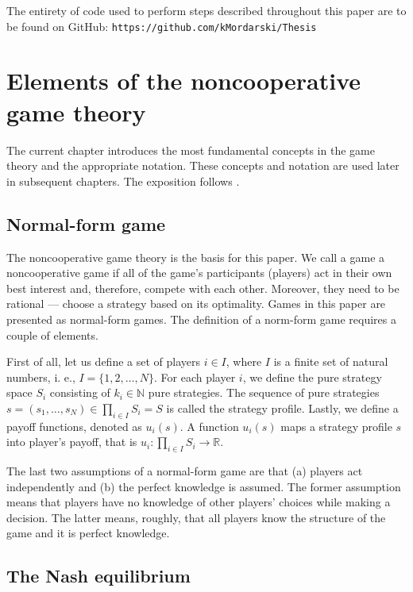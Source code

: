 \documentclass[english, twoside, 12pt, a4paper]{article}
\theoremstyle{definition}
\theoremstyle{plain}
\theoremstyle{remark}
\newcommand{\setn}{\mathbb{N}}
\begin{document}
The entirety of code used to perform steps described throughout this paper are to be found on GitHub: \lstinline+https://github.com/kMordarski/Thesis+
\clearpage
\section{Elements of the noncooperative game theory}

The current chapter introduces the most fundamental concepts in the game theory and the appropriate notation. These concepts and notation are used later in subsequent chapters. The exposition follows \cite{fudenberg1991game,gibbons1992game}.

\subsection{Normal-form game}

The noncooperative game theory is the basis for this paper. We call a game a noncooperative game if all of the game's participants (players) act in their own best interest and, therefore, compete with each other. Moreover, they need to be rational --- choose a strategy based on its optimality. Games in this paper are presented as normal-form games. The definition of a norm-form game requires a couple of elements. 

First of all, let us define a set of players $i \in I$, where $I$ is a finite set of natural numbers, i. e., $I = \{1, 2, \ldots, N\}$. For each player $i$, we define the pure strategy space $S_i$ consisting of $k_i \in \setn$ pure strategies. The sequence of pure strategies $s = \left(s_1, \ldots, s_N \right) \in \prod_{i \in I} S_i = S$ is called the strategy profile. Lastly, we define a payoff functions, denoted as $u_i(s)$. A function \(u_i (s)\) maps a strategy profile \(s\) into player's payoff, that is $u_i: \prod_{i \in I}S_i \rightarrow \mathbb{R}$.

The last two assumptions of a normal-form game are that (a) players act independently and (b) the perfect knowledge is assumed. The former assumption means that players have no knowledge of other players' choices while making a decision. The latter means, roughly, that all players know the structure of the game and it is perfect knowledge.

\subsection{The Nash equilibrium}
\end{document}
